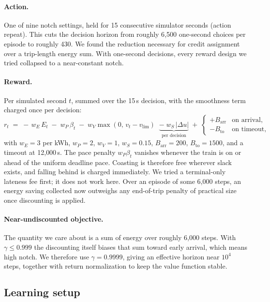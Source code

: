 \documentclass[11pt,a4paper]{article}
\begin{document}
\paragraph{Action.} One of nine notch settings, held for 15 consecutive
simulator seconds (action repeat). This cuts the decision horizon from
roughly 6{,}500 one-second choices per episode to roughly 430. We found
the reduction necessary for credit assignment over a trip-length energy
sum. With one-second decisions, every reward design we tried collapsed to
a near-constant notch.

\paragraph{Reward.} Per simulated second $t$, summed over the 15\,s
decision, with the smoothness term charged once per decision:
\begin{equation}
r_t \;=\; -\,w_E\, E_t \;-\; w_P\, \beta_t \;-\; w_V \max(0,\, v_t - v_{\lim})
\;\;\underbrace{-\; w_S\, |\Delta u|}_{\text{per decision}}
\;+\;
\begin{cases}
+B_{\mathrm{arr}} & \text{on arrival},\\[2pt]
-B_{\mathrm{to}} & \text{on timeout},
\end{cases}
\label{eq:reward}
\end{equation}
with $w_E{=}3$ per kWh, $w_P{=}2$, $w_V{=}1$, $w_S{=}0.15$,
$B_{\mathrm{arr}}{=}200$, $B_{\mathrm{to}}{=}1500$, and a timeout at
12{,}000\,s. The pace penalty $w_P \beta_t$ vanishes whenever the train
is on or ahead of the uniform deadline pace. Coasting is therefore free
wherever slack exists, and falling behind is charged immediately. We
tried a terminal-only lateness fee first; it does not work here. Over an
episode of some 6{,}000 steps, an energy saving collected now outweighs
any end-of-trip penalty of practical size once discounting is applied.

\paragraph{Near-undiscounted objective.} The quantity we care about is a
sum of energy over roughly 6{,}000 steps. With $\gamma \le 0.999$ the
discounting itself biases that sum toward early arrival, which means high
notch. We therefore use $\gamma = 0.9999$, giving an effective horizon
near $10^4$ steps, together with return normalization to keep the value
function stable.

\subsection{Learning setup}
\label{sec:learning}
\end{document}
